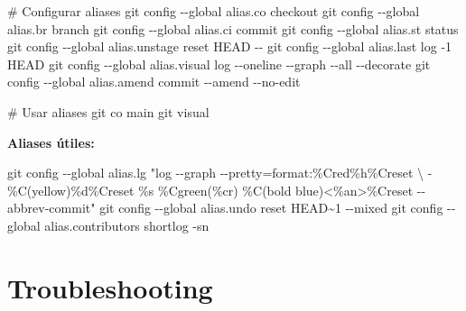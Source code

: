 \documentclass[
  doc,
  floatsintext,
  longtable,
  a4paper,
  nolmodern,
  notxfonts,
  notimes,
  12pt,
  colorlinks=true,linkcolor=blue,citecolor=blue,urlcolor=blue]{apa7}
\newenvironment{Shaded}{\begin{snugshade}}{\end{snugshade}}
\newcommand{\AttributeTok}[1]{\textcolor[rgb]{0.40,0.45,0.13}{#1}}
\newcommand{\CommentTok}[1]{\textcolor[rgb]{0.37,0.37,0.37}{#1}}
\newcommand{\DataTypeTok}[1]{\textcolor[rgb]{0.68,0.00,0.00}{#1}}
\newcommand{\FunctionTok}[1]{\textcolor[rgb]{0.28,0.35,0.67}{#1}}
\newcommand{\NormalTok}[1]{\textcolor[rgb]{0.00,0.23,0.31}{#1}}
\newcommand{\StringTok}[1]{\textcolor[rgb]{0.13,0.47,0.30}{#1}}
\begin{document}
\begin{Shaded}
\begin{Highlighting}[]
\CommentTok{\# Configurar aliases}
\FunctionTok{git}\NormalTok{ config }\AttributeTok{{-}{-}global}\NormalTok{ alias.co checkout}
\FunctionTok{git}\NormalTok{ config }\AttributeTok{{-}{-}global}\NormalTok{ alias.br branch}
\FunctionTok{git}\NormalTok{ config }\AttributeTok{{-}{-}global}\NormalTok{ alias.ci commit}
\FunctionTok{git}\NormalTok{ config }\AttributeTok{{-}{-}global}\NormalTok{ alias.st status}
\FunctionTok{git}\NormalTok{ config }\AttributeTok{{-}{-}global}\NormalTok{ alias.unstage }\StringTok{\textquotesingle{}reset HEAD {-}{-}\textquotesingle{}}
\FunctionTok{git}\NormalTok{ config }\AttributeTok{{-}{-}global}\NormalTok{ alias.last }\StringTok{\textquotesingle{}log {-}1 HEAD\textquotesingle{}}
\FunctionTok{git}\NormalTok{ config }\AttributeTok{{-}{-}global}\NormalTok{ alias.visual }\StringTok{\textquotesingle{}log {-}{-}oneline {-}{-}graph {-}{-}all {-}{-}decorate\textquotesingle{}}
\FunctionTok{git}\NormalTok{ config }\AttributeTok{{-}{-}global}\NormalTok{ alias.amend }\StringTok{\textquotesingle{}commit {-}{-}amend {-}{-}no{-}edit\textquotesingle{}}

\CommentTok{\# Usar aliases}
\FunctionTok{git}\NormalTok{ co main}
\FunctionTok{git}\NormalTok{ visual}
\end{Highlighting}
\end{Shaded}

\textbf{Aliases útiles:}

\begin{Shaded}
\begin{Highlighting}[]
\FunctionTok{git}\NormalTok{ config }\AttributeTok{{-}{-}global}\NormalTok{ alias.lg }\StringTok{"log {-}{-}graph {-}{-}pretty=format:\textquotesingle{}\%Cred\%h\%Creset }\DataTypeTok{\textbackslash{}}
\StringTok{{-}\%C(yellow)\%d\%Creset \%s \%Cgreen(\%cr) \%C(bold blue)\textless{}\%an\textgreater{}\%Creset\textquotesingle{} {-}{-}abbrev{-}commit"}
\FunctionTok{git}\NormalTok{ config }\AttributeTok{{-}{-}global}\NormalTok{ alias.undo }\StringTok{\textquotesingle{}reset HEAD\textasciitilde{}1 {-}{-}mixed\textquotesingle{}}
\FunctionTok{git}\NormalTok{ config }\AttributeTok{{-}{-}global}\NormalTok{ alias.contributors }\StringTok{\textquotesingle{}shortlog {-}sn\textquotesingle{}}
\end{Highlighting}
\end{Shaded}

\section{Troubleshooting}\label{troubleshooting}
\end{document}
